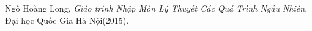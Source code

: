 \begin{thebibliography}{50}
\bibitem{[Kha]} Ngô Hoàng Long, {\it Giáo trình Nhập Môn Lý Thuyết Các Quá Trình Ngẫu Nhiên}, Đại học Quốc Gia Hà Nội(2015).
\end{thebibliography} 

